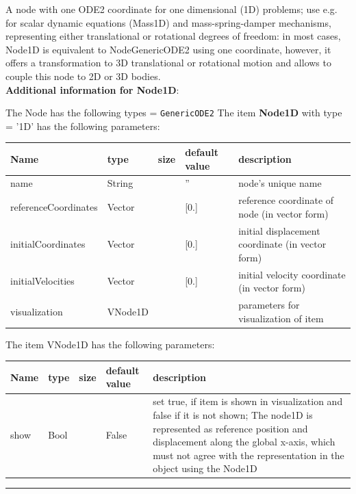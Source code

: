 \label{sec:item:Node1D}
A node with one ODE2 coordinate for one dimensional (1D) problems; use e.g. for scalar dynamic equations (Mass1D) and mass-spring-damper mechanisms, representing either translational or rotational degrees of freedom: in most cases, Node1D is equivalent to NodeGenericODE2 using one coordinate, however, it offers a transformation to 3D translational or rotational motion and allows to couple this node to 2D or 3D bodies.\vspace{12pt}
 \\{\bf Additional information for Node1D}:
\bi
  \item The Node has the following types = \texttt{GenericODE2}
\ei
\vspace{12pt} \noindent The item {\bf Node1D} with type = '1D' has the following parameters:\vspace{-1cm}\\ 
\begin{center}
  \footnotesize
  \begin{longtable}{| p{4.5cm} | p{2.5cm} | p{0.5cm} | p{2.5cm} | p{6cm} |}
    \hline
    \bf Name & \bf type & \bf size & \bf default value & \bf description \\ \hline
    name &     String &      &     '' &     node's unique name\\ \hline
    referenceCoordinates &     Vector &      &     [0.] &     reference coordinate of node (in vector form)\\ \hline
    initialCoordinates &     Vector &      &     [0.] &     initial displacement coordinate (in vector form)\\ \hline
    initialVelocities &     Vector &      &     [0.] &     initial velocity coordinate (in vector form)\\ \hline
    visualization & VNode1D & & & parameters for visualization of item \\ \hline
	  \end{longtable}
	\end{center}
The item VNode1D has the following parameters:\vspace{-1cm}\\ 
\begin{center}
  \footnotesize
  \begin{longtable}{| p{4.5cm} | p{2.5cm} | p{0.5cm} | p{2.5cm} | p{6cm} |}
    \hline
    \bf Name & \bf type & \bf size & \bf default value & \bf description \\ \hline
    show &     Bool &      &     False &     set true, if item is shown in visualization and false if it is not shown; The node1D is represented as reference position and displacement along the global x-axis, which must not agree with the representation in the object using the Node1D\\ \hline
	  \end{longtable}
	\end{center}
\par\noindent\rule{\textwidth}{0.4pt}
\label{description_Node1D}
